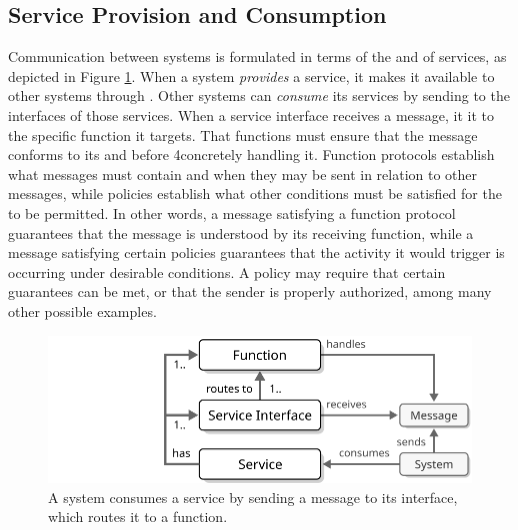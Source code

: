   \vspace*{-3mm}

\subsection{Service Provision and Consumption}

Communication between systems is formulated in terms of the  and  of services, as depicted in Figure \ref{fig:service-consumption}.
When a system \textit{provides} a service, it makes it available to other systems through .
Other systems can \textit{consume} its services by sending  to the interfaces of those services.
When a service interface receives a message, it  it to the specific function it targets.
That functions must ensure that the message conforms to its  and  before 4concretely handling it.
Function protocols establish what messages must contain and when they may be sent in relation to other messages, while policies establish what other conditions must be satisfied for the  to be permitted.
In other words, a message satisfying a function protocol guarantees that the message is understood by its receiving function, while a message satisfying certain policies guarantees that the activity it would trigger is occurring under desirable conditions.
A policy may require that certain  guarantees can be met, or that the sender is properly authorized, among many other possible examples.

\begin{figure}[ht!]
  \centering
  \includegraphics[scale=0.9]{figures/service-consumption}
  \caption{
    A system consumes a service by sending a message to its interface, which routes it to a function.
  }
  \label{fig:service-consumption}
\end{figure}

